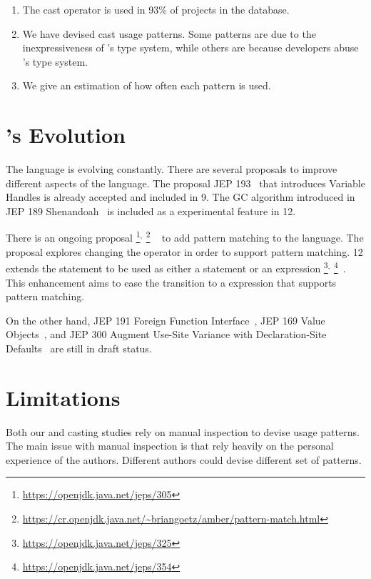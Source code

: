 \begin{enumerate}[label=\ref{casts:rq\arabic*},leftmargin=3.4\parindent]
\item {\bf \crqA} 
The cast operator is used in 93\% of projects in the \lgtm{} database.
\item {\bf \crqB}
We have devised cast usage patterns.
Some patterns are due to the inexpressiveness of \java{}'s type system,
while others are because developers abuse \java{}'s type system.
\item {\bf \crqC} 
We give an estimation of how often each pattern is used.
\end{enumerate}


\section{\java{}'s Evolution}

The \java{} language is evolving constantly.
There are several proposals to improve different aspects of the language.
The proposal JEP 193~\citep{jep193} that introduces Variable Handles is already accepted and included in \java{} 9.
The GC algorithm introduced in JEP 189 Shenandoah~\citep{jep189} is included as a experimental feature in \java{} 12.

There is an ongoing proposal%
\footnote{\url{https://openjdk.java.net/jeps/305}}$^{,}$%
\footnote{\url{https://cr.openjdk.java.net/~briangoetz/amber/pattern-match.html}}%
~\citep{jep305} to add pattern matching to the \java{} language.
The proposal explores changing the  operator in order to support pattern matching.
\java{} 12 extends the  statement to be used as either a statement or an expression%
\footnote{\url{https://openjdk.java.net/jeps/325}}$^{,}$%
\footnote{\url{https://openjdk.java.net/jeps/354}}~\citep{jep325,jep354}.
This enhancement aims to ease the transition to a  expression that supports pattern matching.

On the other hand,
JEP 191 Foreign Function Interface~\citep{jep191},
JEP 169 Value Objects~\citep{jep169}, and
JEP 300 Augment Use-Site Variance with Declaration-Site Defaults~\citep{jep300}
are still in draft status.


\section{Limitations}

Both our \unsafe{} and casting studies rely on manual inspection to devise usage patterns.
The main issue with manual inspection is that rely heavily on the personal experience of the authors.
Different authors could devise different set of patterns.

